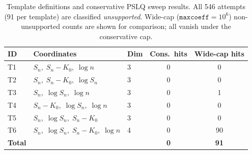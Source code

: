 \begin{table}[ht]
\centering
\caption{Template definitions and conservative PSLQ sweep results.
All 546 attempts (91 per template) are classified \emph{unsupported}.
Wide-cap ($\texttt{maxcoeff}=10^6$) non-unsupported counts are shown for
comparison; all vanish under the conservative cap.}
\smallskip
\begin{tabular}{lllcc}
\hline
ID & Coordinates & Dim & Cons.\ hits & Wide-cap hits \\
\hline
T1 & $S_n,\; S_n{-}K_0,\; \log n$ & 3 & 0 & 0 \\
T2 & $S_n,\; S_n{-}K_0,\; \log S_n$ & 3 & 0 & 0 \\
T3 & $S_n,\; \log S_n,\; \log n$ & 3 & 0 & 1 \\
T4 & $S_n{-}K_0,\; \log S_n,\; \log n$ & 3 & 0 & 0 \\
T5 & $S_n,\; \log S_n,\; S_n{-}K_0$ & 3 & 0 & 0 \\
T6 & $S_n,\; \log S_n,\; S_n{-}K_0,\; \log n$ & 4 & 0 & 90 \\
\hline
\textbf{Total} & & & \textbf{0} & \textbf{91} \\
\hline
\end{tabular}
\label{tab:templates}
\end{table}
